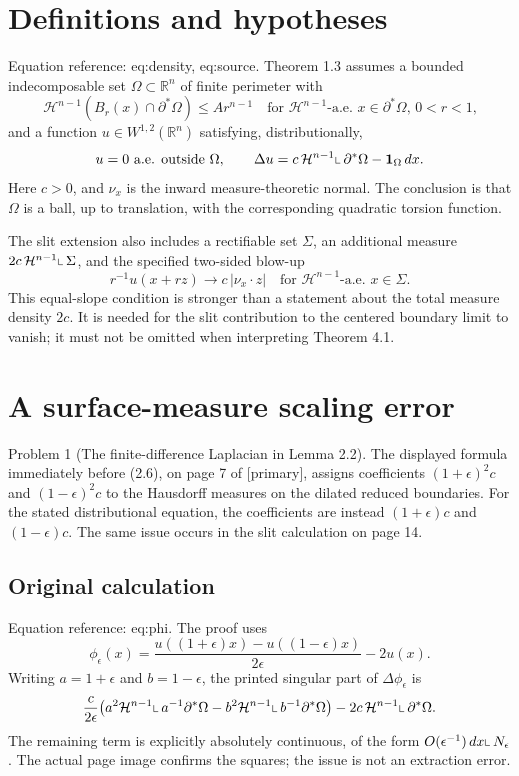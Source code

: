 \documentclass[10pt]{article}
\begin{document}
\section*{Definitions and hypotheses}
Equation reference: eq:density, eq:source. Theorem 1.3 assumes a bounded indecomposable set \(\Omega\subset\mathbb R^n\) of finite perimeter with \[
 \mathcal H^{n-1}(B_r(x)\cap\partial^*\Omega)\leq A r^{n-1}
 \quad\text{for $\mathcal H^{n-1}$-a.e. $x\in\partial^*\Omega$, $0<r<1$,}\] and a function \(u\in W^{1,2}(\mathbb R^n)\) satisfying, distributionally, \[
 u=0\text{ a.e. outside }\Omega,\qquad
 \Delta u=c\,\mathcal H^{n-1}\!\mathbin{\rule{0.4pt}{1.1ex}\rule{0.7ex}{0.4pt}}\partial^*\Omega-\mathbf1_\Omega\,dx .\] Here \(c>0\), and \(\nu_x\) is the inward measure-theoretic normal. The conclusion is that \(\Omega\) is a ball, up to translation, with the corresponding quadratic torsion function.\par
The slit extension also includes a rectifiable set \(\Sigma\), an additional measure \(2c\,\mathcal H^{n-1}\!\mathbin{\rule{0.4pt}{1.1ex}\rule{0.7ex}{0.4pt}}\Sigma\), and the specified two-sided blow-up \[r^{-1}u(x+rz)\longrightarrow c\,|\nu_x\cdot z|
 \quad\text{for $\mathcal H^{n-1}$-a.e. $x\in\Sigma$.}\] This equal-slope condition is stronger than a statement about the total measure density \(2c\). It is needed for the slit contribution to the centered boundary limit to vanish; it must not be omitted when interpreting Theorem 4.1.\par
\section*{A surface-measure scaling error}
Problem 1 (The finite-difference Laplacian in Lemma 2.2).  The displayed formula immediately before (2.6), on page 7 of [primary], assigns coefficients \((1+\epsilon)^2c\) and \((1-\epsilon)^2c\) to the Hausdorff measures on the dilated reduced boundaries. For the stated distributional equation, the coefficients are instead \((1+\epsilon)c\) and \((1-\epsilon)c\). The same issue occurs in the slit calculation on page 14.\par
\subsection*{Original calculation}
Equation reference: eq:phi. The proof uses \[
 \phi_\epsilon(x)=
 \frac{u((1+\epsilon)x)-u((1-\epsilon)x)}{2\epsilon}-2u(x).\] Writing \(a=1+\epsilon\) and \(b=1-\epsilon\), the printed singular part of \(\Delta\phi_\epsilon\) is \[\frac{c}{2\epsilon}
 \bigl(a^2\mathcal H^{n-1}\!\mathbin{\rule{0.4pt}{1.1ex}\rule{0.7ex}{0.4pt}}a^{-1}\partial^*\Omega
       -b^2\mathcal H^{n-1}\!\mathbin{\rule{0.4pt}{1.1ex}\rule{0.7ex}{0.4pt}}b^{-1}\partial^*\Omega\bigr)
 -2c\,\mathcal H^{n-1}\!\mathbin{\rule{0.4pt}{1.1ex}\rule{0.7ex}{0.4pt}}\partial^*\Omega .\] The remaining term is explicitly absolutely continuous, of the form \(O(\epsilon^{-1})\,dx\!\mathbin{\rule{0.4pt}{1.1ex}\rule{0.7ex}{0.4pt}}N_\epsilon\). The actual page image confirms the squares; the issue is not an extraction error.\par
\end{document}
